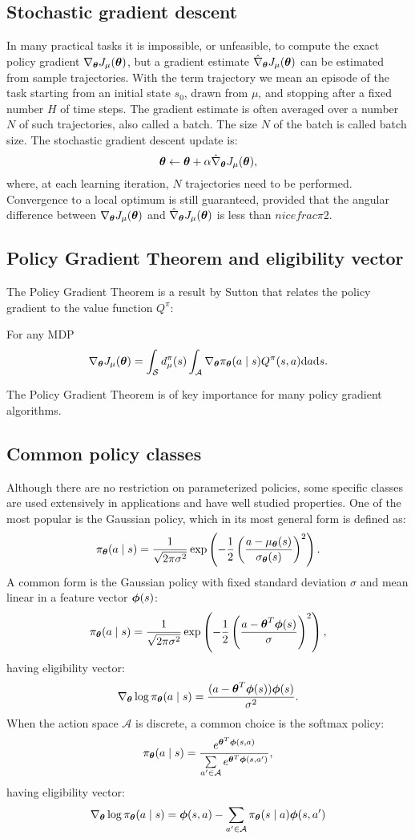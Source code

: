 \subsection{Stochastic gradient descent}
In many practical tasks it is impossible, or unfeasible, to compute the exact policy gradient $\nabla_{\boldsymbol{\theta}}J_\mu(\boldsymbol{\theta})$, but a gradient estimate $\hat{\nabla}_{\boldsymbol{\theta}}J_{\mu}(\boldsymbol{\theta})$ can be estimated from sample trajectories. With the term trajectory we mean an episode of the task starting from an initial state $s_0$, drawn from $\mu$, and stopping after a fixed number $H$ of time steps. The gradient estimate is often averaged over a number $N$ of such trajectories, also called a batch. The size $N$ of the batch is called batch size. The stochastic gradient descent update is:
\[
	\boldsymbol{\theta} \gets \boldsymbol{\theta} + \alpha\hat{\nabla}_{\boldsymbol{\theta}}J_{\mu}(\boldsymbol{\theta}),
\]
where, at each learning iteration, $N$ trajectories need to be performed.
Convergence to a local optimum is still guaranteed, provided that the angular difference between $\nabla_{\boldsymbol{\theta}}J_\mu(\boldsymbol{\theta})$ and $\hat{\nabla}_{\boldsymbol{\theta}}J_{\mu}(\boldsymbol{\theta})$ is less than $nicefrac{\pi}{2}$.

\subsection{Policy Gradient Theorem and eligibility vector}
The Policy Gradient Theorem is a result by Sutton \cite{Sutton1999a} that relates the policy gradient to the value function $Q^\pi$:
\begin{theorem}\label{theo:pgt}
For any \ac{MDP}
\[
	\nabla_{\boldsymbol{\theta}}J_\mu(\boldsymbol{\theta}) = \int_{\mathcal{S}}d_{\mu}^{\pi}(s)
		\int_{\mathcal{A}} \nabla_{\boldsymbol{\theta}}\pi_{\boldsymbol{\theta}}(a \mid s)Q^{\pi}(s,a)\mathrm{d}a\mathrm{d}s.
\]
\end{theorem}
The Policy Gradient Theorem is of key importance for many policy gradient algorithms.

\subsection{Common policy classes}
Although there are no restriction on parameterized policies, some specific classes are used extensively in applications and have well studied properties. One of the most popular is the Gaussian policy, which in its most general form is defined as:
\[
	\pi_{\boldsymbol{\theta}}(a \mid s) = \frac{1}{\sqrt{2\pi\sigma^2}}
		\exp\left(-\frac{1}{2}\left(\frac{a-\mu_{\boldsymbol{\theta}}(s)}
		{\sigma_{\boldsymbol{\theta}}(s)}\right)^2\right).
\]
A common form is the Gaussian policy with fixed standard deviation $\sigma$ and mean linear in a feature vector $\boldsymbol{\phi}(s)$:
\[
	\pi_{\boldsymbol{\theta}}(a \mid s) = \frac{1}{\sqrt{2\pi\sigma^2}}\exp\left(
		-\frac{1}{2}\left(\frac{a-\boldsymbol{\theta}^T\boldsymbol{\phi}(s)}{\sigma}\right)^2\right),
\]
having eligibility vector:
\[
	\nabla_{\boldsymbol{\theta}}\log\pi_{\boldsymbol{\theta}}(a \mid s) = \frac{(a - \boldsymbol{\theta}^T\boldsymbol{\phi}(s))\boldsymbol{\phi}(s)}{\sigma^2}.
\]
When the action space $\mathcal{A}$ is discrete, a common choice is the softmax policy:
\[
	\pi_{\boldsymbol{\theta}}(a \mid s) = \frac{e^{\boldsymbol{\theta}^T\boldsymbol{\phi}(s,a)}}
		{\sum\limits_{a' \in \mathcal{A}}e^{\boldsymbol{\theta}^T\boldsymbol{\phi}(s,a')}},
\]
having eligibility vector:
\[
	\nabla_{\boldsymbol{\theta}}\log\pi_{\boldsymbol{\theta}}(a \mid s) = \boldsymbol{\phi}(s,a) - \sum\limits_{a' \in \mathcal{A}}\pi_{\boldsymbol{\theta}}(s \mid a)\boldsymbol{\phi}(s,a')
\]

